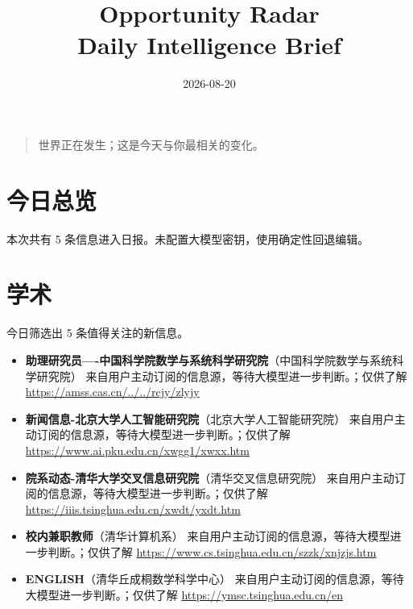 \documentclass[11pt]{ctexart}
\title{Opportunity Radar\\Daily Intelligence Brief}
\date{2026-08-20}
\begin{document}
\maketitle
\begin{quote}\Large 世界正在发生；这是今天与你最相关的变化。\end{quote}
\section*{今日总览}
本次共有 5 条信息进入日报。未配置大模型密钥，使用确定性回退编辑。
\section*{学术}
今日筛选出 5 条值得关注的新信息。
\begin{itemize}
\item \textbf{助理研究员----中国科学院数学与系统科学研究院}（中国科学院数学与系统科学研究院） 来自用户主动订阅的信息源，等待大模型进一步判断。；仅供了解 \url{https://amss.cas.cn/../../rcjy/zlyjy}
\item \textbf{新闻信息-北京大学人工智能研究院}（北京大学人工智能研究院） 来自用户主动订阅的信息源，等待大模型进一步判断。；仅供了解 \url{https://www.ai.pku.edu.cn/xwgg1/xwxx.htm}
\item \textbf{院系动态-清华大学交叉信息研究院}（清华交叉信息研究院） 来自用户主动订阅的信息源，等待大模型进一步判断。；仅供了解 \url{https://iiis.tsinghua.edu.cn/xwdt/yxdt.htm}
\item \textbf{校内兼职教师}（清华计算机系） 来自用户主动订阅的信息源，等待大模型进一步判断。；仅供了解 \url{https://www.cs.tsinghua.edu.cn/szzk/xnjzjs.htm}
\item \textbf{ENGLISH}（清华丘成桐数学科学中心） 来自用户主动订阅的信息源，等待大模型进一步判断。；仅供了解 \url{https://ymsc.tsinghua.edu.cn/en}
\end{itemize}
\end{document}

